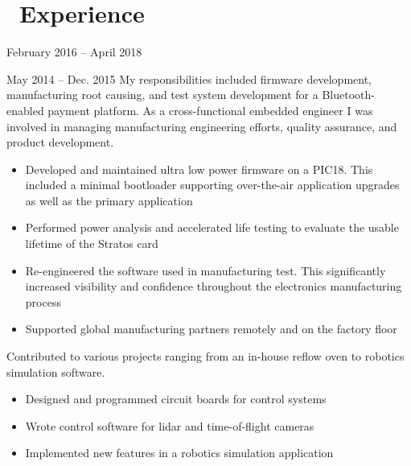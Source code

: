 \documentclass{resume}
\begin{document}


 
\section{\faWrench\ Experience}
          {February 2016 -- April 2018}
\vspace{3mm}

          {May 2014 -- Dec. 2015}
My responsibilities included firmware development, manufacturing
root causing, and test system development for a Bluetooth-enabled payment
platform.  As a cross-functional embedded engineer I was involved in managing
manufacturing engineering efforts, quality assurance, and product development.
\begin{itemize}
  \item Developed and maintained ultra low power firmware on a PIC18. This
      included a minimal bootloader supporting over-the-air application
      upgrades as well as the primary application
  \item Performed power analysis and accelerated life testing to evaluate the
      usable lifetime of the Stratos card
  \item Re-engineered the software used in manufacturing test. This 
      significantly increased visibility and confidence throughout the 
      electronics manufacturing process
  \item Supported global manufacturing partners remotely and on the factory floor
\end{itemize}
\vspace{3mm}

Contributed to various projects ranging from an in-house reflow oven to robotics
simulation software.
\begin{itemize}
  \item Designed and programmed circuit boards for control systems
  \item Wrote control software for lidar and time-of-flight cameras
  \item Implemented new features in a robotics simulation application
\end{itemize}
\vspace{3mm}
\end{document}
